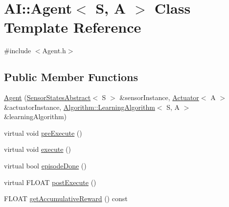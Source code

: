 \hypertarget{classAI_1_1Agent}{\section{A\-I\-:\-:Agent$<$ S, A $>$ Class Template Reference}
\label{classAI_1_1Agent}
}


{\ttfamily \#include $<$Agent.\-h$>$}

\subsection*{Public Member Functions}
\begin{DoxyCompactItemize}
\item 
\hyperlink{classAI_1_1Agent_a2cab0b2534dc40185a3e2f9a858e8023}{Agent} (\hyperlink{classAI_1_1SensorStatesAbstract}{Sensor\-States\-Abstract}$<$ S $>$ \&sensor\-Instance, \hyperlink{classAI_1_1Actuator}{Actuator}$<$ A $>$ \&actuator\-Instance, \hyperlink{classAI_1_1Algorithm_1_1LearningAlgorithm}{Algorithm\-::\-Learning\-Algorithm}$<$ S, A $>$ \&learning\-Algorithm)
\item 
virtual void \hyperlink{classAI_1_1Agent_a938963e5cbbd862402a4b815b9327093}{pre\-Execute} ()
\item 
virtual void \hyperlink{classAI_1_1Agent_a4c1fa5a86e2baa6510fb1448baff8b83}{execute} ()
\item 
virtual bool \hyperlink{classAI_1_1Agent_a65523b33cc9ca3da9200550ecd0a90e0}{episode\-Done} ()
\item 
virtual F\-L\-O\-A\-T \hyperlink{classAI_1_1Agent_ae93d7ac5e75646b0965f18fd9c6a1737}{post\-Execute} ()
\item 
F\-L\-O\-A\-T \hyperlink{classAI_1_1Agent_a86266ab330105f0eabda91d9706133de}{get\-Accumulative\-Reward} () const 
\end{DoxyCompactItemize}
